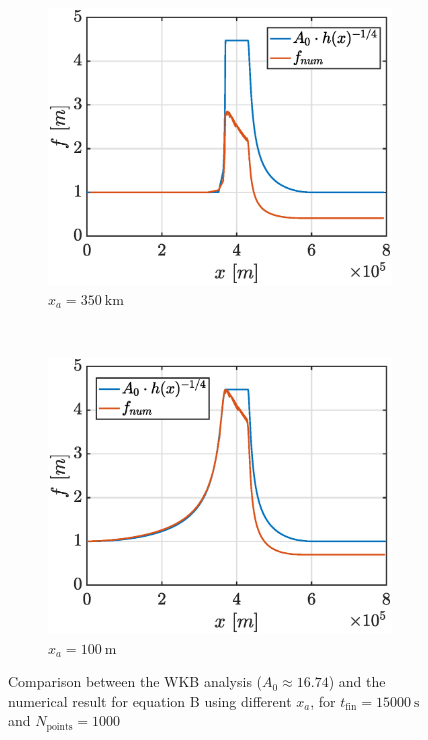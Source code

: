 \documentclass[a4paper,12pt,twoside]{article}
\begin{document}
\begin{figure}[h]
\begin{subfigure}[t]{0.45\textwidth}
                \includegraphics[width=\textwidth]{graphs/xa350000_tfin15000_f.eps}
                \caption{$x_a = \SI{350}{\kilo\meter}$}
                \label{fig:xa-WKB-350km}
            \end{subfigure}
            \\ \centering
            \begin{subfigure}[t]{0.45\textwidth}
              \includegraphics[width=\textwidth]{graphs/xa100_tfin15000_f.eps}
              \caption{$x_a = \SI{100}{\meter}$}
              \label{fig:xa-WKB-100m}
            \end{subfigure}

          \caption{Comparison between the WKB analysis ($A_0 \approx \num{16.74}$) and the numerical result for equation B using different $x_a$, for $t_\text{fin} = \SI{15000}{\s}$ and $N_\text{points} = 1000$}
          \label{fig:xa-WKB}
        \end{figure}
\end{document}
